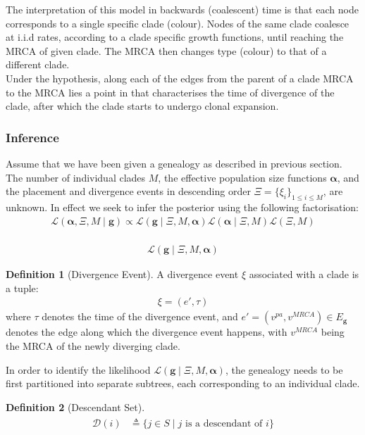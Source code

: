 \documentclass{ieeeaccess}
\theoremstyle{definition}
\newtheorem{definition}{Definition}[section]
\begin{document}
The interpretation of this model in backwards (coalescent) time is that each node corresponds to a single specific clade (colour). Nodes of the same clade coalesce at i.i.d rates, according to a clade specific growth functions, until reaching the MRCA of given clade. The MRCA then changes type (colour) to that of a different clade. \\
Under the hypothesis, along each of the edges from the parent of a clade MRCA to the MRCA lies a point in that characterises the time of divergence of the clade, after which the clade starts to undergo clonal expansion.
\subsubsection{Inference}
Assume that we have been given a genealogy as described in previous section. The number of individual clades $M$, the effective population size functions $\mathbf{\alpha}$, and the placement and divergence events in descending order $\Xi =\{\xi_i\}_{1\leq i\leq M}$, are unknown. In effect we seek to infer the posterior using the following factorisation:
\begin{gather}
\mathcal{L}(\mathbf{\alpha}, \Xi, M\mid\mathbf{g}) \propto 
\mathcal{L}(\mathbf{g}\mid \Xi, M, \mathbf{\alpha})\mathcal{L}(\mathbf{\alpha}\mid\Xi,M)\mathcal{L}(\Xi,M)
\end{gather}\\
\begin{gather}
\mathcal{L}(\mathbf{g}\mid \Xi, M, \mathbf{\alpha})
\end{gather}
\begin{definition}[Divergence Event] A divergence event $\xi$ associated with a clade is a tuple:
\begin{gather}
\xi=\left(e', \tau\right)
\end{gather}
where $\tau$ denotes the time of the divergence event, and $e' = (v^{pa}, v^{MRCA}) \in E_{\mathbf{g}}$ denotes the edge along which the divergence event happens, with $v^{MRCA}$ being the MRCA of the newly diverging clade.
\end{definition}
In order to identify the likelihood $\mathcal{L}(\mathbf{g}\mid \Xi, M, \mathbf{\alpha})$, the genealogy needs to be first partitioned into separate subtrees, each corresponding to an individual clade.
\begin{definition}[Descendant Set]
\begin{gather}
\begin{aligned}
\mathcal{D}(i) &\triangleq \{j\in S\mid j \text{ is a descendant of } i\}
\end{aligned}
\end{gather} 
\end{definition}
\end{document}
